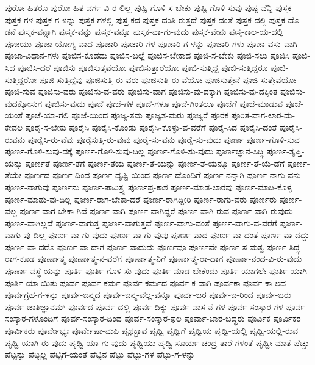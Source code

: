 {ಪುರೋ-ಹಿತರೂ
ಪುರೋ-ಹಿತ-ವರ್ಗ-ವಿ-ರ-ಲಿಲ್ಲ
ಪುಷ್ಟಿ-ಗೊಳಿ-ಸ-ಬೇಕು
ಪುಷ್ಟಿ-ಗೊಳಿ-ಸುವು
ಪುಷ್ಪ-ವೆನ್ನಿ
ಪುಸ್ತಕ
ಪುಸ್ತಕ-ಗಳ
ಪುಸ್ತಕ-ಗ-ಳನ್ನು
ಪುಸ್ತಕ-ಗಳಲ್ಲಿ
ಪುಸ್ತ-ಕದ
ಪುಸ್ತಕ-ದಂತಿ-ರುತ್ತದೆ
ಪುಸ್ತಕ-ದಂತೆ
ಪುಸ್ತಕ-ದಲ್ಲಿ
ಪುಸ್ತಕ-ದೊ-ಡನೆ
ಪುಸ್ತಕ-ವನ್ನಾಗಿ
ಪುಸ್ತಕ-ವನ್ನು
ಪುಸ್ತಕ-ವನ್ನೂ
ಪುಸ್ತಕ-ವಾ-ಗು-ವುದು
ಪುಸ್ತಕ-ವೇನು
ಪುಸ್ತ-ಕಾಲ-ಯ-ದಲ್ಲಿ
ಪೂಜಯು
ಪೂಜಾ-ಯೋಗ್ಯ-ವಾದ
ಪೂಜಾರಿ
ಪೂಜಾರಿ-ಗಳ
ಪೂಜಾರಿ-ಗ-ಳನ್ನು
ಪೂಜಾರಿ-ಗಳು
ಪೂಜಾ-ವಸ್ತು-ವಾಗಿ
ಪೂಜಾ-ವಿಧಾನ-ಗಳು
ಪೂಜಿಸ-ಕೂಡದು
ಪೂಜಿಸ-ಬಲ್ಲೆ
ಪೂಜಿಸ-ಬೇಕಾದ
ಪೂಜಿ-ಸ-ಬೇಕು
ಪೂಜಿ-ಸಲು
ಪೂಜಿಸಿ
ಪೂಜಿ-ಸಿದ
ಪೂಜಿಸಿ-ದರೆ
ಪೂಜಿಸು
ಪೂಜಿಸುತ್ತವೆಯೋ
ಪೂಜಿಸುತ್ತಾರೆಯೋ
ಪೂಜಿ-ಸುತ್ತಿದ್ದ
ಪೂಜಿ-ಸುತ್ತಿದ್ದರೂ
ಪೂಜಿ-ಸುತ್ತಿದ್ದರೋ
ಪೂಜಿ-ಸುತ್ತಿದ್ದೆವು
ಪೂಜಿಸುತ್ತಿ-ರು-ವರು
ಪೂಜಿಸುತ್ತಿ-ರು-ವೆಯೋ
ಪೂಜಿಸುತ್ತೇನೆ
ಪೂಜಿ-ಸುತ್ತೇವೆಯೋ
ಪೂಜಿ-ಸುವ
ಪೂಜಿಸು-ವರು
ಪೂಜಿಸು-ವ-ವರು
ಪೂಜಿಸು-ವಾಗ
ಪೂಜಿಸು-ವು-ದಕ್ಕಾಗಿ
ಪೂಜಿಸು-ವು-ದಕ್ಕಿಂತ
ಪೂಜಿಸು-ವುದಕ್ಕೋಸುಗ
ಪೂಜಿಸು-ವುದು
ಪೂಜೆ
ಪೂಜೆ-ಗಳ
ಪೂಜೆ-ಗಳೂ
ಪೂಜೆ-ಗಿಂತಲೂ
ಪೂಜೆಗೆ
ಪೂಜೆ-ಮಾಡುವ
ಪೂಜೆ-ಯಂತೆ
ಪೂಜೆ-ಯಾ-ಗಲಿ
ಪೂಜೆ-ಯಿಂದ
ಪೂಜ್ಯ-ತಮ
ಪೂಜ್ಯತ-ಮರು
ಪೂಜ್ಯರೆ
ಪೂರಕ
ಪೂರಿತ-ವಾಗ-ಲಾರ-ದು-ಕೇವಲ
ಪೂರೈ-ಸ-ಬೇಕು
ಪೂರೈಸಿ
ಪೂರೈಸಿ-ಕೊಂಡು
ಪೂರೈಸಿ-ಕೊಳ್ಳು-ವ-ವರೆಗೆ
ಪೂರೈ-ಸಿದ
ಪೂರೈಸಿ-ದಂತೆ
ಪೂರೈಸಿ-ರುವನು
ಪೂರೈಸಿ-ರು-ವೆವು
ಪೂರೈಸುತ್ತಿ-ರು-ವುವು
ಪೂರೈ-ಸು-ವನು
ಪೂರೈ-ಸು-ವುದು
ಪೂರ್ಣ
ಪೂರ್ಣ-ಗೊಳಿ-ಸುವ
ಪೂರ್ಣ-ಗೊಳಿ-ಸುವು-ದಕ್ಕೆ
ಪೂರ್ಣ-ಗೊಳಿ-ಸುವು-ದಿಲ್ಲ
ಪೂರ್ಣ-ಗೊಳಿ-ಸು-ವುದು
ಪೂರ್ಣಜ್ಞಾನ-ಸಿದ್ಧಿ
ಪೂರ್ಣ-ತೃಪ್ತಿ-ಯನ್ನು
ಪೂರ್ಣತೆ
ಪೂರ್ಣ-ತೆಗೆ
ಪೂರ್ಣ-ತೆಯ
ಪೂರ್ಣ-ತೆ-ಯನ್ನು
ಪೂರ್ಣ-ತೆ-ಯನ್ನೂ
ಪೂರ್ಣ-ತೆ-ಯೆ-ಡೆಗೆ
ಪೂರ್ಣ-ತೆಯೇ
ಪೂರ್ಣದ
ಪೂರ್ಣ-ದಿಂದ
ಪೂರ್ಣ-ದೃಷ್ಟಿ-ಯಿಂದ
ಪೂರ್ಣ-ದೊಂದಿಗೆ
ಪೂರ್ಣ-ನನ್ನಾಗಿ
ಪೂರ್ಣ-ನಾಗು-ವನು
ಪೂರ್ಣ-ನಾಗುವು
ಪೂರ್ಣನು
ಪೂರ್ಣ-ಪಾವಿತ್ರ್ಯ
ಪೂರ್ಣಪ್ರ-ಕಾಶ
ಪೂರ್ಣ-ಮಾಡ-ಲಾರವು
ಪೂರ್ಣ-ಮಾಡಿ-ಕೊಳ್ಳ
ಪೂರ್ಣ-ಮಾಡು-ವು-ದಿಲ್ಲ
ಪೂರ್ಣ-ರಾಗ-ಬೇಕಾ-ದರೆ
ಪೂರ್ಣ-ರಾಗಿದ್ದೀರಿ
ಪೂರ್ಣ-ರಾಗು-ವರು
ಪೂರ್ಣರು
ಪೂರ್ಣ-ವಲ್ಲ
ಪೂರ್ಣ-ವಾಗ-ಬೇಕಾ-ಗಿದೆ
ಪೂರ್ಣ-ವಾಗಿ
ಪೂರ್ಣ-ವಾಗಿದ್ದರೆ
ಪೂರ್ಣ-ವಾಗಿ-ರುವ
ಪೂರ್ಣ-ವಾಗಿ-ರುವುದು
ಪೂರ್ಣ-ವಾಗಿಲ್ಲದೆ
ಪೂರ್ಣ-ವಾಗುತ್ತ
ಪೂರ್ಣ-ವಾಗುತ್ತವೆ
ಪೂರ್ಣ-ವಾಗು-ವಂತೆ
ಪೂರ್ಣ-ವಾಗು-ವ-ವರೆಗೆ
ಪೂರ್ಣ-ವಾಗು-ವು-ದಿಲ್ಲ
ಪೂರ್ಣ-ವಾ-ಗು-ವುದು
ಪೂರ್ಣ-ವಾ-ಗು-ವುವು
ಪೂರ್ಣ-ವಾದ
ಪೂರ್ಣ-ವಾ-ದಂತೆ
ಪೂರ್ಣ-ವಾ-ದದ್ದು
ಪೂರ್ಣ-ವಾ-ದರೊ
ಪೂರ್ಣ-ವಾ-ದಾಗ
ಪೂರ್ಣ-ವಾದುದು
ಪೂರ್ಣವೂ
ಪೂರ್ಣವೇ
ಪೂರ್ಣ-ಸ-ಮತ್ವ
ಪೂರ್ಣ-ಸಿದ್ಧ-ರಾಗ-ಕೂಡ
ಪೂರ್ಣಾತ್ಮ
ಪೂರ್ಣಾತ್ಮ-ನ-ವರೆಗೆ
ಪೂರ್ಣಾತ್ಮ-ನಿಗೆ
ಪೂರ್ಣಾತ್ಮ-ರಾ-ದಾಗ
ಪೂರ್ಣಾ-ನಂದ-ವಿ-ರು-ವುದು
ಪೂರ್ಣಾ-ವಸ್ಥೆ-ಯನ್ನು
ಪೂರ್ತಿ
ಪೂರ್ತಿ-ಗೊಳಿ-ಸು-ವುದು
ಪೂರ್ತಿ-ಮಾಡ-ಬೇಕೆಂದು
ಪೂರ್ತಿ-ಯಾಗಲೇ
ಪೂರ್ತಿ-ಯಾಗಿ
ಪೂರ್ತಿ-ಯಾ-ಯಿತು
ಪೂರ್ವ
ಪೂರ್ವ-ಕರ್ಮ
ಪೂರ್ವ-ಕರ್ಮದ
ಪೂರ್ವ-ಕ-ವಾಗಿ
ಪೂರ್ವಕಾ
ಪೂರ್ವ-ಕಾ-ಲದ
ಪೂರ್ವಗ್ರಹ-ಗ-ಳನ್ನು
ಪೂರ್ವ-ಜನ್ಮದ
ಪೂರ್ವ-ಜನ್ಮ-ವೆಲ್ಲ-ವನ್ನೂ
ಪೂರ್ವ-ಜರ
ಪೂರ್ವ-ಜ-ರಿಂದ
ಪೂರ್ವ-ಜರು
ಪೂರ್ವ-ಜಾತಿಜ್ಞಾನಮ್
ಪೂರ್ವದ
ಪೂರ್ವ-ದಲ್ಲಿ
ಪೂರ್ವ-ದಿಕ್ಕು
ಪೂರ್ವ-ವಾಸ-ನೆ-ಗಳ
ಪೂರ್ವ-ಸಂಸ್ಕಾರ-ಗಳ
ಪೂರ್ವ-ಸಂಸ್ಕಾರ-ಗಳೊಂದಿಗೆ
ಪೂರ್ವ-ಸಂಸ್ಕಾರ-ದಿಂದ
ಪೂರ್ವ-ಸಂಸ್ಕಾರ-ಫಲ
ಪೂರ್ವಾ-ಚಾರ-ಬದ್ಧರು
ಪೂರ್ವಿಕ
ಪೂರ್ವಿಕರ
ಪೂರ್ವಿಕರು
ಪೂರ್ವೇಭ್ಯಃ
ಪೂರ್ವೇಷಾ-ಮಪಿ
ಪೃಥಕ್ಭಾವ
ಪೃಥ್ವಿ
ಪೃಥ್ವಿಗೆ
ಪೃಥ್ವಿಯ
ಪೃಥ್ವಿ-ಯಲ್ಲಿ
ಪೃಥ್ವಿ-ಯಲ್ಲಿ-ರುವ
ಪೃಥ್ವಿ-ಯಾಗಿ-ರು-ವುದು
ಪೃಥ್ವಿ-ಯಾ-ಗು-ವುದು
ಪೃಥ್ವಿಯು
ಪೃಥ್ವಿ-ಸೂರ್ಯ-ಚಂದ್ರ-ತಾರೆ-ಗಳಂತೆ
ಪೃಥ್ವೀ-ಮಾತೆ
ಪೆಚ್ಚು
ಪೆಟ್ಟನ್ನು
ಪೆಟ್ಟಲ್ಲ
ಪೆಟ್ಟಿಗೆ-ಯಂತೆ
ಪೆಟ್ಟಿನ
ಪೆಟ್ಟು
ಪೆಟ್ಟು-ಗಳ
ಪೆಟ್ಟು-ಗ-ಳನ್ನು
}
